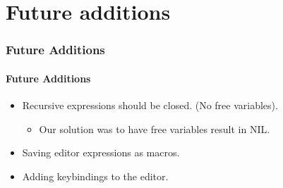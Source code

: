 \section{Future additions}


\begin{frame}
    \frametitle{Future Additions}
    \framesubtitle{Future Additions}
    \begin{itemize}
        \item Recursive expressions should be closed. (No free variables).
              \begin{itemize}
                  \item Our solution was to have free variables result in NIL.
              \end{itemize}
              \pause
        \item Saving editor expressions as macros.
              \pause
        \item Adding keybindings to the editor.
    \end{itemize}
\end{frame}

